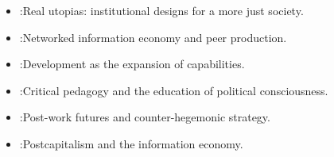 \begin{itemize}[nosep]
  \item \textcite{wright2010}:Real utopias: institutional designs for a more just society.
  \item \textcite{benkler2006}:Networked information economy and peer production.
  \item \textcite{sen1999}:Development as the expansion of capabilities.
  \item \textcite{freire1968}:Critical pedagogy and the education of political consciousness.
  \item \textcite{srnicek2015}:Post-work futures and counter-hegemonic strategy.
  \item \textcite{mason2015}:Postcapitalism and the information economy.
\end{itemize}
